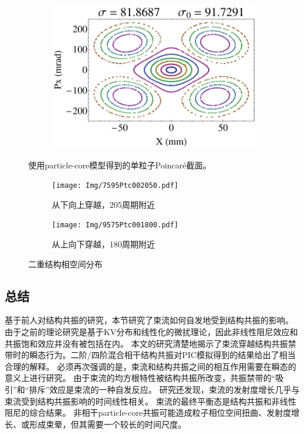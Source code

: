 \begin{figure}
\begin{subfigure}[b]{0.24\textwidth}
        \caption{}\label{sfig:TestPtc3}
    \end{subfigure}
    \begin{subfigure}[b]{0.24\textwidth}
        \includegraphics[width=\textwidth]{Img/TestParticle4.pdf}
        \caption{}\label{sfig:TestPtc4}
    \end{subfigure}
    \caption{使用particle-core模型得到的单粒子Poincar\'{e}截面。}
    \label{fig:TestPtc}
\end{figure}

\begin{figure}[!hbp]
    \centering
    \begin{subfigure}[b]{0.45\textwidth}
        \texttt{[image: Img/7595Ptc002050.pdf]}
        \caption{从下向上穿越，205周期附近}
        \label{sfig:Ptc2tails1}
    \end{subfigure}
    \begin{subfigure}[b]{0.45\textwidth}
        \texttt{[image: Img/9575Ptc001800.pdf]}
        \caption{从上向下穿越，180周期附近}
        \label{sfig:Ptc2tails2}
    \end{subfigure}
    \caption{二重结构相空间分布}
    \label{fig:Ptc2tail}
\end{figure}


\subsection{总结}
\label{section:Crossing_Summary}
基于前人对结构共振的研究，本节研究了束流如何自发地受到结构共振的影响。
由于之前的理论研究是基于KV分布和线性化的微扰理论，因此非线性阻尼效应和共振饱和效应并没有被包括在内。
本文的研究清楚地揭示了束流穿越结构共振禁带时的瞬态行为。二阶/四阶混合相干结构共振对PIC模拟得到的结果给出了相当合理的解释。
必须再次强调的是，束流和结构共振之间的相互作用需要在瞬态的意义上进行研究。
由于束流的均方根特性被结构共振所改变，共振禁带的“吸引”和“排斥”效应是束流的一种自发反应。
研究还发现，束流的发射度增长几乎与束流受到结构共振影响的时间线性相关。
束流的最终平衡态是结构共振和非线性阻尼的综合结果。
非相干particle-core共振可能造成粒子相位空间扭曲、发射度增长、或形成束晕，但其需要一个较长的时间尺度。

